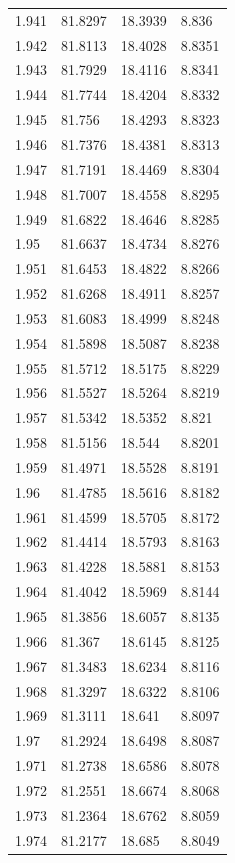 \begin{tabular}{llll}
1.941 & 81.8297 & 18.3939 & 8.836 \\
1.942 & 81.8113 & 18.4028 & 8.8351 \\
1.943 & 81.7929 & 18.4116 & 8.8341 \\
1.944 & 81.7744 & 18.4204 & 8.8332 \\
1.945 & 81.756 & 18.4293 & 8.8323 \\
1.946 & 81.7376 & 18.4381 & 8.8313 \\
1.947 & 81.7191 & 18.4469 & 8.8304 \\
1.948 & 81.7007 & 18.4558 & 8.8295 \\
1.949 & 81.6822 & 18.4646 & 8.8285 \\
1.95 & 81.6637 & 18.4734 & 8.8276 \\
1.951 & 81.6453 & 18.4822 & 8.8266 \\
1.952 & 81.6268 & 18.4911 & 8.8257 \\
1.953 & 81.6083 & 18.4999 & 8.8248 \\
1.954 & 81.5898 & 18.5087 & 8.8238 \\
1.955 & 81.5712 & 18.5175 & 8.8229 \\
1.956 & 81.5527 & 18.5264 & 8.8219 \\
1.957 & 81.5342 & 18.5352 & 8.821 \\
1.958 & 81.5156 & 18.544 & 8.8201 \\
1.959 & 81.4971 & 18.5528 & 8.8191 \\
1.96 & 81.4785 & 18.5616 & 8.8182 \\
1.961 & 81.4599 & 18.5705 & 8.8172 \\
1.962 & 81.4414 & 18.5793 & 8.8163 \\
1.963 & 81.4228 & 18.5881 & 8.8153 \\
1.964 & 81.4042 & 18.5969 & 8.8144 \\
1.965 & 81.3856 & 18.6057 & 8.8135 \\
1.966 & 81.367 & 18.6145 & 8.8125 \\
1.967 & 81.3483 & 18.6234 & 8.8116 \\
1.968 & 81.3297 & 18.6322 & 8.8106 \\
1.969 & 81.3111 & 18.641 & 8.8097 \\
1.97 & 81.2924 & 18.6498 & 8.8087 \\
1.971 & 81.2738 & 18.6586 & 8.8078 \\
1.972 & 81.2551 & 18.6674 & 8.8068 \\
1.973 & 81.2364 & 18.6762 & 8.8059 \\
1.974 & 81.2177 & 18.685 & 8.8049 \\

\end{tabular}
